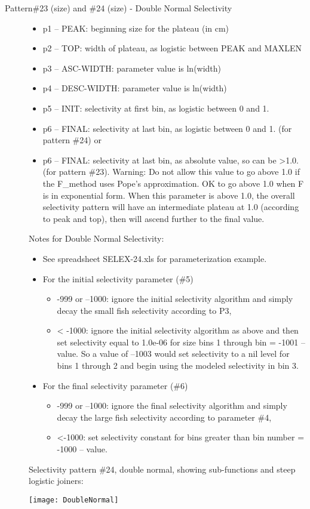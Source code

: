\begin{description}
	\item[Pattern\#23 (size) and \#24 (size) - Double Normal Selectivity]\hfil
	\begin{itemize}
		\item p1 – PEAK:  beginning size for the plateau (in cm)
		\item p2 – TOP:  width of plateau, as logistic between PEAK and MAXLEN
		\item p3 – ASC-WIDTH:  parameter value is ln(width)
		\item p4 – DESC-WIDTH:  parameter value is ln(width)
		\item p5 – INIT:  selectivity at first bin, as logistic between 0 and 1.
		\item p6 – FINAL: selectivity at last bin, as logistic between 0 and 1.  (for pattern \#24) or
		\item p6 – FINAL: selectivity at last bin, as absolute value, so can be >1.0.  (for pattern \#23).  Warning:  Do not allow this value to go above 1.0 if the F\_method uses Pope’s approximation.  OK to go above 1.0 when F is in exponential form.  When this parameter is above 1.0, the overall selectivity pattern will have an intermediate plateau at 1.0 (according to peak and top), then will ascend further to the final value.
	\end{itemize}
	Notes for Double Normal Selectivity:
	\begin{itemize}
		\item See spreadsheet SELEX-24.xls for parameterization example.
		\item For the initial selectivity parameter (\#5)
		\begin{itemize}
			\item -999 or –1000:   ignore the initial selectivity algorithm and simply decay the small fish selectivity according to P3,
			\item < -1000:  ignore the initial selectivity algorithm as above and then set selectivity equal to 1.0e-06 for size bins 1 through bin =  -1001 –value.  So a value of –1003 would set selectivity to a nil level for bins 1 through 2 and begin using the modeled selectivity in bin 3.
		\end{itemize}
		\item For the final selectivity parameter (\#6)
		\begin{itemize}
			\item -999 or –1000:   ignore the final selectivity algorithm and simply decay the large fish selectivity according to parameter \#4,
			\item <-1000:  set selectivity constant for bins greater than bin number =  -1000 – value.
		\end{itemize}
	\end{itemize}
	Selectivity pattern \#24, double normal, showing sub-functions and steep logistic joiners:
	\begin{center}
		\texttt{[image: DoubleNormal]}
	\end{center}
\end{description}

